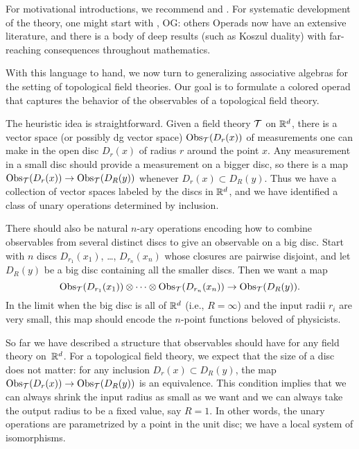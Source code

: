 \documentclass[11pt]{amsart}
\def\owen#1{{\textcolor{violet!50!black}{OG: {#1}}}}
\begin{document}
\begin{rmk}
For motivational introductions, we recommend \cite{StashAMS} and \cite{Val12}.
For systematic development of the theory, one might start with \cite{LodVal}, \owen{others}
Operads now have an extensive literature, and there is a body of deep results (such as Koszul duality) with far-reaching consequences throughout mathematics.
\end{rmk}

With this language to hand, we now turn to generalizing associative algebras for the setting of topological field theories. 
Our goal is to formulate a colored operad that captures the behavior of the observables of a topological field theory.

The heuristic idea is straightforward.
Given a field theory $\mathcal T$ on $\mathbb R^d$, there is a vector space (or possibly dg vector space) ${\rm Obs}_\mathcal T(D_r(x))$ of measurements one can make in the open disc $D_r(x)$ of radius $r$ around the point $x$.
Any measurement in a small disc should provide a measurement on a bigger disc,
so there is a map ${\rm Obs}_\mathcal T(D_r(x)) \to {\rm Obs}_\mathcal T(D_R(y))$ whenever $D_r(x) \subset D_R(y)$.
Thus we have a collection of vector spaces labeled by the discs in $\mathbb R^d$,
and we have identified a class of unary operations determined by inclusion.

There should also be natural $n$-ary operations encoding how to combine observables from several distinct discs to give an observable on a big disc.
Start with $n$ discs $D_{r_1}(x_1)$, \dots , $D_{r_n}(x_n)$ whose closures are pairwise disjoint, and let $D_R(y)$ be a big disc containing all the smaller discs.
Then we want a map
\[
{\rm Obs}_\mathcal T(D_{r_1}(x_1)) \otimes \cdots \otimes {\rm Obs}_\mathcal T(D_{r_n}(x_n)) \to {\rm Obs}_\mathcal T(D_R(y)).
\]
In the limit when the big disc is all of $\mathbb R^d$ (i.e., $R = \infty$) and the input radii $r_i$ are very small, 
this map should encode the $n$-point functions beloved of physicists.

So far we have described a structure that observables should have for any field theory on~$\mathbb R^d$.
For a topological field theory, we expect that the size of a disc does not matter:
for any inclusion $D_r(x) \subset D_R(y)$, the map ${\rm Obs}_\mathcal T(D_r(x)) \to {\rm Obs}_\mathcal T(D_R(y))$ is an equivalence.
This condition implies that we can always shrink the input radius as small as we want and we can always take the output radius to be a fixed value, say $R =1$.
In other words, the unary operations are parametrized by a point in the unit disc;
we have a local system of isomorphisms.
\end{document}
